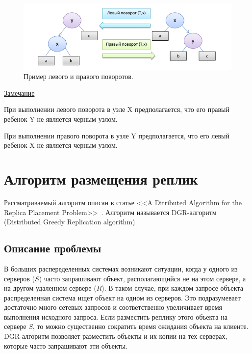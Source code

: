 		\begin{figure}[H]
			\centering
			\includegraphics[width=\textwidth]{img/shift.png}
			\caption{Пример левого и правого поворотов.}
		\end{figure}

		\underline{Замечание}

		При выполнении левого поворота в узле X предполагается, что
		его правый ребенок Y не является черным узлом.
	
		При выполнении правого поворота в узле Y предполагается, что
		его левый ребенок X не является черным узлом.

	\section{Алгоритм размещения реплик}	
		Рассматриваемый алгоритм описан в статье <<A Ditributed Algorithm for the Replica Placement Problem>>~\cite{rep}.
		Алгоритм называется DGR-алгоритм (Distributed Greedy Replication algorithm).

		\subsection{Описание проблемы}
			В больших распеределенных системах возникают ситуации, когда у одного из серверов ($S$) часто запрашивают объект,
			располагающийся не на этом сервере, а на другом удаленном сервере ($R$). В таком случае, при каждом запросе объекта
			распределенная система ищет объект на одном из серверов. Это подразумевает достаточно много сетевых запросов и 
			соответственно увеличивает время выполнения исходного запроса. Если разместить реплику этого объекта на сервере $S$,
			то можно существенно сократить время ожидания объекта на клиенте. DGR-алгоритм позволяет разместить объекты и их
			копии на тех серверах, которые часто запрашивают эти объекты. 

